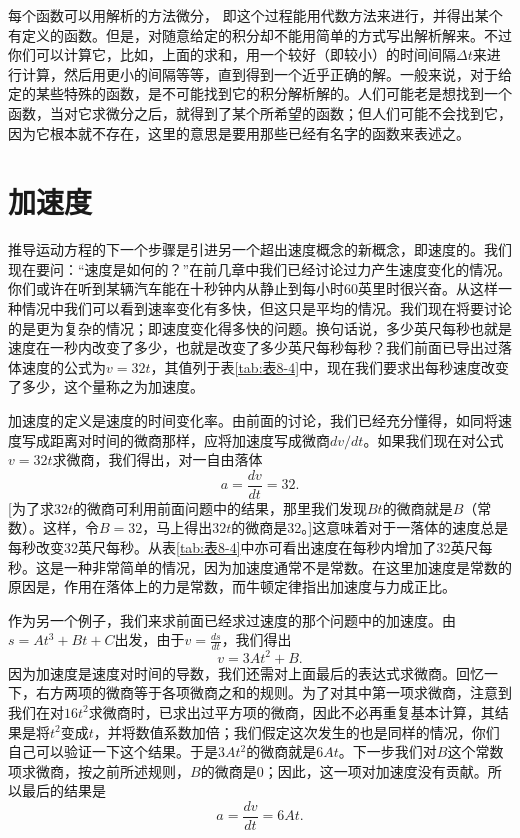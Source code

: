 \documentclass[12pt,oneside]{book}
\begin{document}
每个函数可以用解析的方法微分， 即这个过程能用代数方法来进行，并得出某个有定义的函数。但是，对随意给定的积分却不能用简单的方式写出解析解来。不过你们可以计算它，比如，上面的求和，用一个较好（即较小）的时间间隔$\Delta t$来进行计算，然后用更小的间隔等等，直到得到一个近乎正确的解。一般来说，对于给定的某些特殊的函数，是不可能找到它的积分解析解的。人们可能老是想找到一个函数，当对它求微分之后，就得到了某个所希望的函数；但人们可能不会找到它，因为它根本就不存在，这里的意思是要用那些已经有名字的函数来表述之。




\section{加速度}
推导运动方程的下一个步骤是引进另一个超出速度概念的新概念，即速度的。我们现在要问：“速度是如何的？”在前几章中我们已经讨论过力产生速度变化的情况。你们或许在听到某辆汽车能在十秒钟内从静止到每小时60英里时很兴奋。从这样一种情况中我们可以看到速率变化有多快，但这只是平均的情况。我们现在将要讨论的是更为复杂的情况；即速度变化得多快的问题。换句话说，多少英尺每秒也就是速度在一秒内改变了多少，也就是改变了多少英尺每秒每秒？我们前面已导出过落体速度的公式为$v=32t$，其值列于表\ref{tab:表8-4}中，现在我们要求出每秒速度改变了多少，这个量称之为加速度。

加速度的定义是速度的时间变化率。由前面的讨论，我们已经充分懂得，如同将速度写成距离对时间的微商那样，应将加速度写成微商$dv/dt$。如果我们现在对公式$v=32t$求微商，我们得出，对一自由落体
\begin{equation}
\label{Eq:I:8:9}
a=\frac{dv}{dt}=32.
\end{equation}
[为了求$32t$的微商可利用前面问题中的结果，那里我们发现$Bt$的微商就是$B$（常数）。这样，令$B=32$，马上得出$32t$的微商是32。]这意味着对于一落体的速度总是每秒改变32英尺每秒。从表\ref{tab:表8-4}中亦可看出速度在每秒内增加了32英尺每秒。这是一种非常简单的情况，因为加速度通常不是常数。在这里加速度是常数的原因是，作用在落体上的力是常数，而牛顿定律指出加速度与力成正比。

作为另一个例子，我们来求前面已经求过速度的那个问题中的加速度。由$s=At^3+Bt+C$出发，由于$v=\frac{ds}{dt}$，我们得出
\begin{equation*}
v=3At^2+B.
\end{equation*}
因为加速度是速度对时间的导数，我们还需对上面最后的表达式求微商。回忆一下，右方两项的微商等于各项微商之和的规则。为了对其中第一项求微商，注意到我们在对$16t^2$求微商时，已求出过平方项的微商，因此不必再重复基本计算，其结果是将$t^2$变成$t$，并将数值系数加倍；我们假定这次发生的也是同样的情况，你们自己可以验证一下这个结果。于是$3At^2$的微商就是$6At$。下一步我们对$B$这个常数项求微商，按之前所述规则，$B$的微商是0；因此，这一项对加速度没有贡献。所以最后的结果是
\begin{equation*}
a=\frac{dv}{dt}=6At.
\end{equation*}
\end{document}

